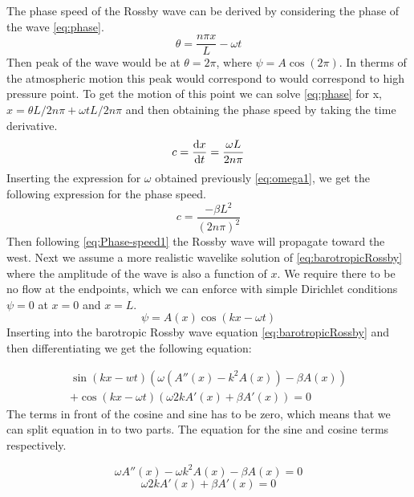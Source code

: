The phase speed of the Rossby wave can be derived by considering the phase of
the wave \cref{eq:phase}.
\begin{equation}\label{eq:phase}
    \theta = \frac{n \pi x}{L} - \omega t
\end{equation}
Then peak of the wave would be at $\theta = 2\pi$, where $\psi = A\cos{(2\pi)}$.
In therms of the atmospheric motion this peak would correspond to would
correspond to high pressure point. To get the motion of this point we can solve
\cref{eq:phase} for x, $x=\theta L / 2n \pi + \omega t L / 2n \pi$ and then
obtaining the phase speed by taking the time derivative.
\begin{equation}
    c = \dv{x}{t} = \frac{\omega L}{2n\pi}
\end{equation}
Inserting the expression for $\omega$ obtained previously \cref{eq:omega1}, we
get the following expression for the phase speed.
\begin{equation}\label{eq:Phase-speed1}
    c = \frac{-\beta L^2}{(2n\pi)^2}
\end{equation}
Then following \cref{eq:Phase-speed1} the Rossby wave will propagate
toward the west.
Next we assume a more realistic wavelike solution of \cref{eq:barotropicRossby}
where the amplitude of the wave is also a function of $x$. We
require there to be no flow at the endpoints, which we can enforce with simple
Dirichlet conditions $\psi= 0$ at $x=0$ and $x=L$.
\begin{equation}\label{eq:waveSolution2}
    \psi = A(x)\cos{(kx-\omega t)}
\end{equation}
Inserting \label{eq:waveSolution2} into the barotropic Rossby wave equation
\cref{eq:barotropicRossby} and then differentiating we get the following
equation:

\begin{equation}\label{eq:step1}
    \begin{split}
    \sin{(kx-wt)\left(\omega(A''(x)-k^2A(x))- \beta A(x)\right)} \\
    + \cos{(kx - \omega t)}\left(\omega 2kA'(x) +\beta A'(x)\right) = 0
    \end{split}
\end{equation}
The terms in front of the cosine and sine has to be zero, which means that we
can split equation in to two parts. The equation for the sine and cosine terms
respectively.

\begin{equation}\label{eq:sine-terms}
    \omega A''(x) -\omega k^2 A(x) - \beta A(x) = 0
\end{equation}
\begin{equation}\label{eq:cos-terms}
    \omega 2 k A'(x) + \beta A'(x) = 0
\end{equation}


